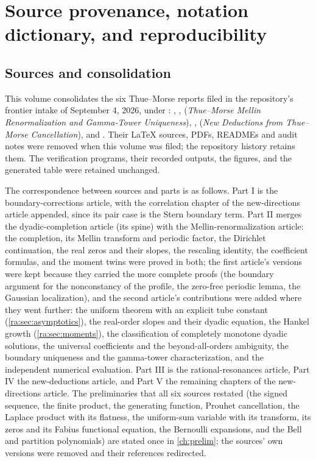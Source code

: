 \documentclass[11pt,a4paper,oneside,openany]{book}
\numberwithin{equation}{chapter}
\theoremstyle{definition}
\theoremstyle{remark}
\begin{document}
\chapter{Source provenance, notation dictionary, and reproducibility}
\label{app:provenance}
\section{Sources and consolidation}
This volume consolidates the six Thue--Morse reports filed in the
repository's frontier intake of September 4, 2026, under
: ,
, 
(\emph{Thue--Morse Mellin Renormalization and Gamma-Tower Uniqueness}),
, 
(\emph{New Deductions from Thue--Morse Cancellation}), and
. Their \LaTeX{} sources, PDFs, READMEs and
audit notes were removed when this volume was filed; the repository history
retains them. The verification programs, their recorded outputs, the
figures, and the generated table were retained unchanged.

The correspondence between sources and parts is as follows. Part I is the
boundary-corrections article, with the correlation chapter of the
new-directions article appended, since its pair case is the Stern boundary
term. Part II merges the dyadic-completion article (its spine) with the
Mellin-renormalization article: the completion, its Mellin transform and
periodic factor, the Dirichlet continuation, the real zeros and their
slopes, the rescaling identity, the coefficient formulas, and the moment
twins were proved in both; the first article's versions were kept because
they carried the more complete proofs (the boundary argument for the
nonconstancy of the profile, the zero-free periodic lemma, the Gaussian
localization), and the second article's contributions were added where they
went further: the uniform theorem with an explicit tube constant
(\cref{ra:sec:asymptotics}), the real-order slopes and their dyadic
equation, the Hankel growth (\cref{ra:sec:moments}), the classification of
completely monotone dyadic solutions, the universal coefficients and the
beyond-all-orders ambiguity, the boundary uniqueness and the gamma-tower
characterization, and the independent numerical evaluation. Part III is the
rational-resonances article, Part IV the new-deductions article, and Part V
the remaining chapters of the new-directions article. The preliminaries
that all six sources restated (the signed sequence, the finite product, the
generating function, Prouhet cancellation, the Laplace product with its
flatness, the uniform-sum variable with its transform, its zeros and its
Fabius functional equation, the Bernoulli expansions, and the Bell and
partition polynomials) are stated once in \cref{ch:prelim}; the sources'
own versions were removed and their references redirected.
\end{document}
